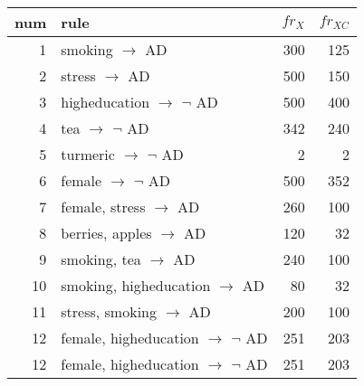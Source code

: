 

\begin{tabular}{|r|l|r|r|}
    \hline
    num & rule                                          & $\mathit{fr_X}$ & $\mathit{fr_{XC}}$ \\
    \hline
    1   & smoking $\rightarrow$ AD                      & 300             & 125                \\
    2   & stress $\rightarrow$ AD                       & 500             & 150                \\
    3   & higheducation $\rightarrow$ $\neg$ AD         & 500             & 400                \\
    4   & tea $\rightarrow$ $\neg$ AD                   & 342             & 240                \\
    5   & turmeric $\rightarrow$ $\neg$ AD              & 2               & 2                  \\
    6   & female $\rightarrow$ $\neg$ AD                & 500             & 352                \\
    7   & female, stress $\rightarrow$ AD               & 260             & 100                \\
    8   & berries, apples $\rightarrow$ AD              & 120             & 32                 \\
    9   & smoking, tea $\rightarrow$ AD                 & 240             & 100                \\
    10  & smoking, higheducation $\rightarrow$ AD       & 80              & 32                 \\
    11  & stress, smoking $\rightarrow$ AD              & 200             & 100                \\
    12  & female, higheducation $\rightarrow$ $\neg$ AD & 251             & 203                \\
    12  & female, higheducation $\rightarrow$ $\neg$ AD & 251             & 203                \\
    \hline
\end{tabular}